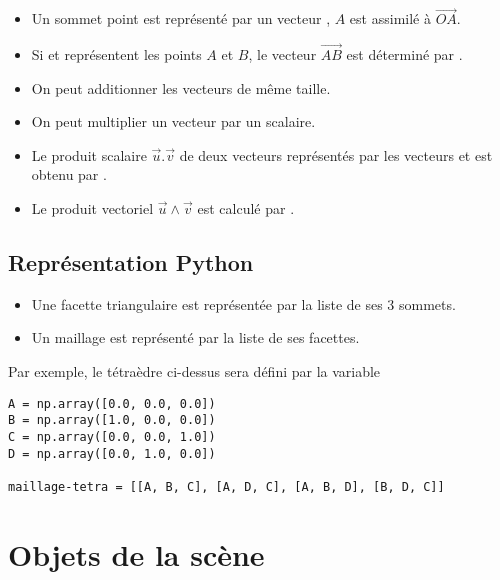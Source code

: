 \medskip


\begin{itemize}
    \item Un sommet point est représenté par un vecteur , $A$ est assimilé à $\overrightarrow{OA}$.
    \item Si  et  représentent les points $A$ et $B$, le vecteur $\overrightarrow{AB}$ est déterminé par .
    \item On peut additionner les vecteurs  de même taille.
    \item On peut multiplier un vecteur par un scalaire.
    \item Le produit scalaire $\vec u.\vec v$ de deux vecteurs représentés par les vecteurs   et  est obtenu par .
    \item Le produit vectoriel $\vec u \wedge \vec v$ est calculé par .
\end{itemize}
\subsection*{Représentation Python} 
\begin{itemize}
\item Une facette triangulaire est représentée par la liste de ses 3 sommets.
\item Un maillage est représenté par la liste de ses facettes.
\end{itemize}

Par exemple, le tétraèdre ci-dessus sera défini par la variable 
\begin{lstlisting}
A = np.array([0.0, 0.0, 0.0])
B = np.array([1.0, 0.0, 0.0])
C = np.array([0.0, 0.0, 1.0])
D = np.array([0.0, 1.0, 0.0])

maillage-tetra = [[A, B, C], [A, D, C], [A, B, D], [B, D, C]]
\end{lstlisting}
\section{Objets de la scène} 
